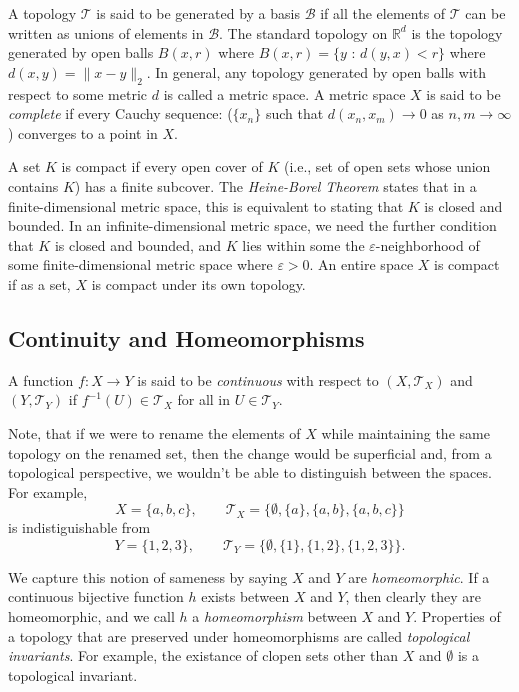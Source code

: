 \documentclass[12pt]{article}
\begin{document}
A topology $\mathcal{T}$ is said to be generated by a basis $\mathcal{B}$ if
all the elements of $\mathcal{T}$ can be written as unions of elements
in $\mathcal{B}$.
The standard topology on $\mathbb{R}^d$ is the topology generated by open
balls $B(x,r)$ where $B(x,r) = \{y \text{ : }  d(y,x) < r\}$ where 
$d(x,y) = \|x - y\|_2$.
In general, any topology generated by open balls with respect to some
metric $d$ is called a metric space.
A metric space $X$ is said to be {\it complete} if every Cauchy sequence:
($\{x_n\}$ such that $d(x_n, x_m) \rightarrow 0$ as $n,m \rightarrow \infty$)
converges to a point in $X$.

A set $K$ is compact if every open cover of $K$ (i.e., set of
open sets whose union contains $K$) has a finite subcover.
The {\it Heine-Borel Theorem} states that
in a finite-dimensional metric space, this is equivalent to stating that $K$ is
closed and bounded.
In an infinite-dimensional metric space, we need the further condition that $K$
is closed and bounded, and $K$ lies within some the $\varepsilon$-neighborhood
of some finite-dimensional metric space where $\varepsilon > 0$.
An entire space $X$ is compact if as a set, $X$ is compact under its own 
topology.

\subsection*{Continuity and Homeomorphisms}

A function $f : X \rightarrow Y$ is said to be {\it continuous} with respect to
$(X, \mathcal{T}_X)$ and $(Y,\mathcal{T}_Y)$ if $f^{-1}(U) \in \mathcal{T}_X$ 
for all in $U \in \mathcal{T}_Y$.

Note, that if we were to rename the elements of $X$ while maintaining the
same topology on the renamed set, then the change would be
superficial and, from a topological perspective, we wouldn't be able to
distinguish between the spaces.
For example,
$$
X = \{a, b, c\}, \qquad 
\mathcal{T}_X = \{ \emptyset, \{a\}, \{a,b\}, \{a,b,c\}\}
$$
is indistiguishable from
$$
Y = \{1, 2, 3\}, \qquad 
\mathcal{T}_Y = \{ \emptyset, \{1\}, \{1,2\}, \{1,2,3\}\}.
$$

We capture this notion of sameness by saying $X$ and $Y$ are {\it homeomorphic}.
If a continuous bijective function $h$ exists between $X$ and $Y$, then clearly
they are homeomorphic, and we call $h$ a {\it homeomorphism} between $X$ and 
$Y$.
Properties of a topology that are preserved under homeomorphisms are called
{\it topological invariants}.
For example, the existance of clopen sets other than $X$ and $\emptyset$ is a
topological invariant.
\end{document}
